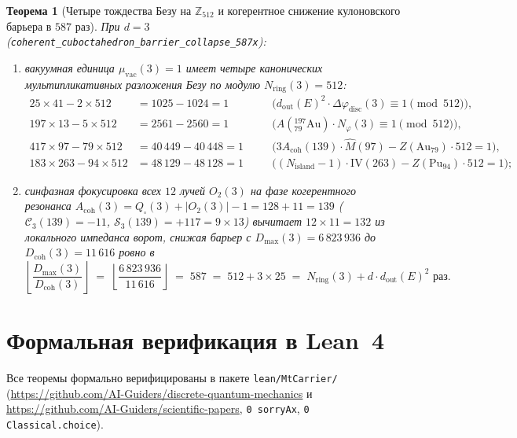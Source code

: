 \documentclass[11pt,a4paper]{article}
\theoremstyle{plain}
\newtheorem{theorem}{Теорема}[section]
\theoremstyle{definition}
\begin{document}
\begin{theorem}[Четыре тождества Безу на $\mathbb{Z}_{512}$ и когерентное снижение кулоновского барьера в $587$ раз]
\label{thm:nuclear-587}
При $d=3$ (\texttt{coherent\_cuboctahedron\_barrier\_collapse\_587x}):
\begin{enumerate}[label=\textbf{(\roman*)},leftmargin=*,noitemsep]
\item вакуумная единица $\mu_{\mathrm{vac}}(3) = 1$ имеет четыре канонических мультипликативных разложения Безу по модулю $N_{\mathrm{ring}}(3) = 512$:
  \begin{equation}
    \label{eq:four-bezout-512}
    \begin{aligned}
      25\times 41 - 2\times 512 &= 1025 - 1024 = 1 &\quad &\bigl(d_{\mathrm{out}}(E)^2\cdot\Delta\varphi_{\mathrm{disc}}(3) \equiv 1\pmod{512}\bigr), \\
      197\times 13 - 5\times 512 &= 2561 - 2560 = 1 &\quad &\bigl(A(^{197}_{79}\mathrm{Au})\cdot N_\varphi(3) \equiv 1\pmod{512}\bigr), \\
      417\times 97 - 79\times 512 &= 40\,449 - 40\,448 = 1 &\quad &\bigl(3 A_{\mathrm{coh}}(139)\cdot\hat{M}(97) - Z(\mathrm{Au}_{79})\cdot 512 = 1\bigr), \\
      183\times 263 - 94\times 512 &= 48\,129 - 48\,128 = 1 &\quad &\bigl((N_{\mathrm{island}}-1)\cdot\mathrm{IV}(263) - Z(\mathrm{Pu}_{94})\cdot 512 = 1\bigr);
    \end{aligned}
  \end{equation}
\item синфазная фокусировка всех $12$ лучей $O_2(3)$ на фазе когерентного резонанса $A_{\mathrm{coh}}(3) = Q_\square(3) + |O_2(3)| - 1 = 128 + 11 = 139$ ($\mathcal{C}_3(139) = -11$, $\mathcal{S}_3(139) = +117 = 9\times 13$) вычитает $12\times 11 = 132$ из локального импеданса ворот, снижая барьер с $D_{\max}(3) = 6\,823\,936$ до $D_{\mathrm{coh}}(3) = 11\,616$ ровно в
  \begin{equation}
    \label{eq:collapse-587}
    \left\lfloor \frac{D_{\max}(3)}{D_{\mathrm{coh}}(3)}\right\rfloor \;=\; \left\lfloor \frac{6\,823\,936}{11\,616}\right\rfloor \;=\; 587 \;=\; 512 + 3\times 25 \;=\; N_{\mathrm{ring}}(3) + d\cdot d_{\mathrm{out}}(E)^2 \text{ раз.}
  \end{equation}
\end{enumerate}
\end{theorem}

\section{Формальная верификация в Lean~4}
Все теоремы формально верифицированы в пакете \texttt{lean/MtCarrier/} (\url{https://github.com/AI-Guiders/discrete-quantum-mechanics} и \url{https://github.com/AI-Guiders/scientific-papers}, \texttt{0 sorryAx}, \texttt{0 Classical.choice}).
\end{document}
